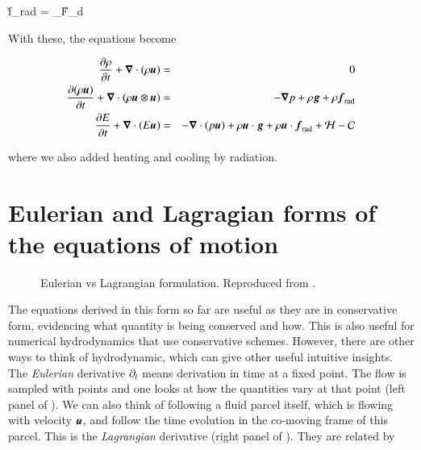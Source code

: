 \beq
\v{f}_{\rm rad} =  \int \kappa_\nu \v{F}_\nu d\nu 
\eeq

With these, the equations become

\begin{eqnarray}
  \frac{\partial{\rho}}{\partial{t}} + {\boldsymbol{\nabla}}\cdot{\left(\rho {\boldsymbol{u}}\right)} &=& 0 \\
\frac{\partial{\left(\rho {\boldsymbol{u}}\right)}}{\partial{t}} + {\boldsymbol{\nabla}}\cdot{\left(\rho
  {\boldsymbol{u}}\otimes{\boldsymbol{u}}\right)} &=& -{\boldsymbol{\nabla}}{p} + \rho{\boldsymbol{g}} + \rho{\boldsymbol{f}}_{\rm rad}\\
\frac{\partial{E}}{\partial{t}} + {\boldsymbol{\nabla}}\cdot{\left(E{\boldsymbol{u}}\right)} &=& -{\boldsymbol{\nabla}}\cdot{\left(p{\boldsymbol{u}}\right)}
                                            + \rho{\boldsymbol{u}}\cdot{\boldsymbol{g}}+
                                            \rho{\boldsymbol{u}}\cdot{\boldsymbol{f}}_{\rm
                                            rad} + \mathcal{H} -\mathcal{C} 
  \end{eqnarray}

\noindent where we also added heating and cooling by radiation.

\section{Eulerian and Lagragian forms of the equations of motion}

\begin{figure}
  \begin{center}
  \end{center}
  \caption[]{Eulerian vs Lagrangian formulation. Reproduced from
    \cite{Leishman}.}
  \label{fig:eulerian-lagrangian}
\end{figure}

The equations derived in this form so far are useful as they are in
conservative form, evidencing what quantity is being conserved and
how. This is also useful for numerical hydrodynamics that use
conservative schemes. However, there are other ways to think of
hydrodynamic, which can give other useful intuitive insights. The
{\it Eulerian} derivative $\partial_t$ means derivation in time at a
fixed point. The flow is sampled with points and one looks at how the
quantities vary at that point (left panel of ). We can also think of following a fluid
parcel itself, which is flowing with velocity ${\boldsymbol{u}}$, and follow the
time evolution in the co-moving frame of this parcel. This is the {\it
  Lagrangian} derivative (right panel of ). They are related by 

